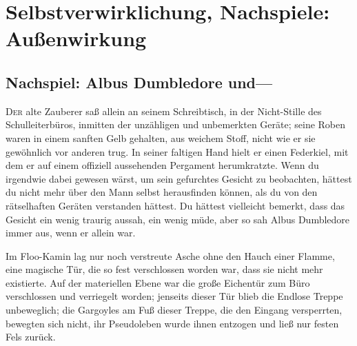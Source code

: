 \chapter{Selbstverwirklichung, Nachspiele: Außenwirkung}

\section{Nachspiel: Albus Dumbledore und—}

\lettrine{D}{er} alte Zauberer saß allein an seinem Schreibtisch, in der Nicht-Stille des Schulleiterbüros, inmitten der unzähligen und unbemerkten Geräte; seine Roben waren in einem sanften Gelb gehalten, aus weichem Stoff, nicht wie er sie gewöhnlich vor anderen trug. In seiner faltigen Hand hielt er einen Federkiel, mit dem er auf einem offiziell aussehenden Pergament herumkratzte. Wenn du irgendwie dabei gewesen wärst, um sein gefurchtes Gesicht zu beobachten, hättest du nicht mehr über den Mann selbst herausfinden können, als du von den rätselhaften Geräten verstanden hättest. Du hättest vielleicht bemerkt, dass das Gesicht ein wenig traurig aussah, ein wenig müde, aber so sah Albus Dumbledore immer aus, wenn er allein war.

Im Floo-Kamin lag nur noch verstreute Asche ohne den Hauch einer Flamme, eine magische Tür, die so fest verschlossen worden war, dass sie nicht mehr existierte. Auf der materiellen Ebene war die große Eichentür zum Büro verschlossen und verriegelt worden; jenseits dieser Tür blieb die Endlose Treppe unbeweglich; die Gargoyles am Fuß dieser Treppe, die den Eingang versperrten, bewegten sich nicht, ihr Pseudoleben wurde ihnen entzogen und ließ nur festen Fels zurück.

